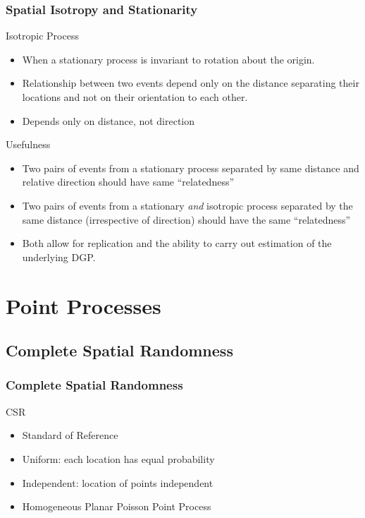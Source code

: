 \documentclass[nototal,handout]{beamer}
\begin{document}
 \begin{frame}[<+->]
   \frametitle{Spatial Isotropy and Stationarity}
   \begin{block}{Isotropic Process}
     \begin{itemize}
       \item When a stationary process is invariant to rotation about the
	 origin.
       \item Relationship between two events depend only on the distance
	 separating their locations and not on their orientation to each
	 other.
       \item Depends only on distance, not direction
     \end{itemize}
    \end{block}

    \begin{block}{Usefulness}
      \begin{itemize}
	\item Two pairs of events from a stationary process
	  separated by same distance and relative direction should have same
	  ``relatedness''
	\item Two pairs of events from a stationary \emph{and} isotropic
	  process separated by the same distance (irrespective of direction)
	  should have the same ``relatedness''
	\item Both allow for replication and the ability to carry out
	  estimation of the underlying DGP.
      \end{itemize}
     \end{block}
  \end{frame}

  \section{Point Processes}
\subsection{Complete Spatial Randomness}
\begin{frame}
  \frametitle{Complete Spatial Randomness}
  \begin{block}{CSR}
    \begin{itemize}
      \item Standard of Reference
      \item Uniform: each location has equal probability
      \item Independent: location of points independent
      \item Homogeneous Planar Poisson Point Process
    \end{itemize}
   \end{block}
 \end{frame}
\end{document}
